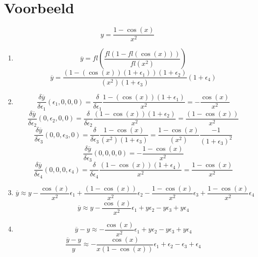 \documentclass[12pt,a4paper]{article}
\begin{document}
\section{Voorbeeld}
\[
y = \frac{1-\cos(x)}{x^2}
\]
\begin{enumerate}
\item
\[
\overline{y} = fl\left(\frac{fl(1-fl(\cos(x)))}{fl(x^2)}\right)
\]
\[
\overline{y} = \frac{(1-(\cos(x))(1+\epsilon_1))(1+\epsilon_2)}{(x^2)(1+\epsilon_3)}(1+\epsilon_4)
\]

\item
\[
\frac{\delta \overline{y}}{\delta \epsilon_1}(\epsilon_1,0,0,0)
= \frac{\delta}{\delta \epsilon_1}\frac{1-(\cos(x))(1+\epsilon_1)}{x^2} 
= -\frac{\cos(x)}{x^2}
\]
\[
\frac{\delta \overline{y}}{\delta \epsilon_2}(0,\epsilon_2,0,0)
= \frac{\delta}{\delta \epsilon_2}\frac{(1-\cos(x))(1+\epsilon_2)}{x^2}
= \frac{(1-\cos(x))}{x^2}
\]
\[
\frac{\delta \overline{y}}{\delta \epsilon_3}(0,0,\epsilon_3,0)
= \frac{\delta}{\delta \epsilon_3}\frac{1-\cos(x)}{(x^2)(1+\epsilon_3)} = \frac{1-\cos(x)}{(x^2)}\frac{-1}{(1+\epsilon_3)^2}
\]
\[
\frac{\delta \overline{y}}{\delta \epsilon_3}(0,0,0,0) = -\frac{1-\cos(x)}{x^2}
\]
\[
\frac{\delta \overline{y}}{\delta \epsilon_4}(0,0,0,\epsilon_4)
= \frac{\delta}{\delta \epsilon_4}\frac{(1-\cos(x))(1+\epsilon_4)}{x^2}
= \frac{1 - \cos(x)}{x^2}
\]

\item
\[
\overline{y} \approx y -\frac{\cos(x)}{x^2}\epsilon_1
+ \frac{(1-\cos(x))}{x^2}\epsilon_2
- \frac{1-\cos(x)}{x^2}\epsilon_3
+ \frac{1 - \cos(x)}{x^2}\epsilon_4
\]
\[
\overline{y} \approx y - \frac{\cos(x)}{x^2}\epsilon_1 + y\epsilon_2 - y\epsilon_3 + y\epsilon_4
\]

\item
\[
\overline{y}-y \approx - \frac{\cos(x)}{x^2}\epsilon_1 + y\epsilon_2 - y\epsilon_3 + y\epsilon_4
\]
\[
\frac{\overline{y}-y}{y} \approx - \frac{\cos(x)}{x(1-\cos(x))}\epsilon_1 + \epsilon_2 - \epsilon_3 + \epsilon_4
\]

\end{enumerate}
\end{document}
